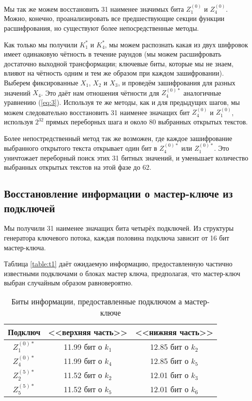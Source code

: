 \documentclass[12pt, a4paper]{article}
\begin{document}
Мы так же можем восстановить 31 наименее значимых бита $Z^{(0)}_1$ и $Z^{(0)}_4$. Можно, конечно, проанализировать все предшествующие секции функции расшифрования, но существуют более непосредственные методы.

Как только мы получили $K^*_1$ и $K^*_4$, мы можем распознать какая из двух шифровок имеет одинаковую чётность в течение раундов (мы можем расшифровать достаточно выходной трансформации; ключевые биты, которые мы не знаем, влияют на чётность одним и тем же образом при каждом зашифровании). Выберем фиксированные $X_1$, $X_2$ и $X_3$, и проведём зашифрования для разных значений $X_4$.  Это даёт нам отношения чётности для $Z^{(0)*}_4$ аналогичные уравнению (\ref{eq:3}). Используя те же методы, как и для предыдущих шагов, мы можем следовательно восстановить 31 наименее значащих бит $Z^{(0)}_4$ и $Z^{(0)}_1$, используя $2^{32}$ прямых переборных шага и около 80 выбранных открытых текстов.

Более непостредственный метод так же возможен, где каждое зашифрование выбранного открытого текста открывает один бит в $Z^{(0)*}_4$ или $Z^{(0)*}_1$. Это уничтожает переборный поиск этих 31 битных значений, и уменьшает количество выбранных открытых текстов на этой фазе до 62. 

\subsection{Восстановление информации о мастер-ключе из подключей}

Мы получили 31 наименее значащих бита четырёх подключей. Из структуры генератора ключевого потока, каждая половина подключа зависит от 16 бит мастер-ключа.

Таблица \ref{table:t1} даёт ожидаемую информацию, предоставленную частично известными подключами о блоках мастер ключа, предполагая, что мастер-ключ выбран случайным образом равновероятно.

\begin{table}[h]
\center
\caption{Биты информации, предоставленные подключом а мастер-ключе}
\begin{tabular}{|ccc|}
\hline
\textbf{Подключ} & \textbf{<<верхняя часть>>} & \textbf{<<нижняя часть>>} \\
\hline
 $Z^{(0)*}_1$ & 11.99 бит о $k_1$ & 12.85 бит о $k_2$ \\
 $Z^{(0)*}_4$ & 11.99 бит о $k_4$ & 12.85 бит о $k_5$ \\
 $Z^{(5)*}_2$ & 11.52 бит о $k_2$ & 12.01 бит о $k_3$ \\
 $Z^{(5)*}_5$ & 11.52 бит о $k_5$ & 12.01 бит о $k_6$ \\
\hline
\end{tabular}
\end{table}
\end{document}
